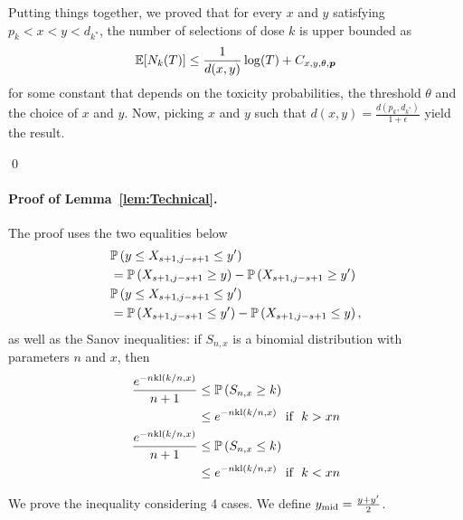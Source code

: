 Putting things together, we proved that for every $x$ and $y$ satisfying $p_k < x < y < d_{k^*}$, the number of selections of dose $k$ is upper bounded as 
\[ \mathbb{E}[N_k(T)] \leq \frac{1}{d(x,y)}\log(T) + C_{x,y,\theta,\bm p}\]
for some constant that depends on the toxicity probabilities, the threshold $\theta$ and the choice of $x$ and $y$. Now, picking $x$ and $y$ such that $d(x,y) = \frac{d(p_k,d_{k^*})}{1+\epsilon}$ yield the result. 

\qed 

\paragraph{Proof of Lemma~\ref{lem:Technical}.} The proof uses the two equalities below
\begin{align}
\nonumber
& \mathbb{P}\left(y \leq X_{s+1,j-s+1} \leq y'\right)
\\ & = \mathbb{P}\left(X_{s+1,j-s+1} \geq y\right) - \mathbb{P}\left(X_{s+1,j-s+1} \geq y'\right)\label{ForSmallS}
\\ \nonumber &
\mathbb{P}\left(y \leq X_{s+1,j-s+1} \leq y'\right)
\\ & = \mathbb{P}\left(X_{s+1,j-s+1} \leq y'\right) - \mathbb{P}\left(X_{s+1,j-s+1} \leq y\right),\label{ForLargeS}
\end{align}
as well as the Sanov inequalities: if $S_{n,x}$ is a binomial distribution with parameters $n$ and $x$, then 
\begin{align}
\nonumber
\frac{e^{-n\mathrm{kl}(k/n,x)}}{n+1}
& \leq \mathbb{P}\left(S_{n,x} \geq k\right) 
\\ & \leq e^{-n\mathrm{kl}(k/n,x)} \ \ \text{if } \ k > xn \label{Sanov}
\\ \nonumber
\frac{e^{-n\mathrm{kl}(k/n,x)}}{n+1}
& \leq \mathbb{P}\left(S_{n,x} \leq k\right)
\\ & \leq
	e^{-n\mathrm{kl}(k/n,x)} \ \ \text{if } \ k < xn \label{SanovMin}
\end{align}

We prove the inequality considering 4 cases. We define $y_{\mathrm{mid}} = \frac{y+y'}{2}$. 

